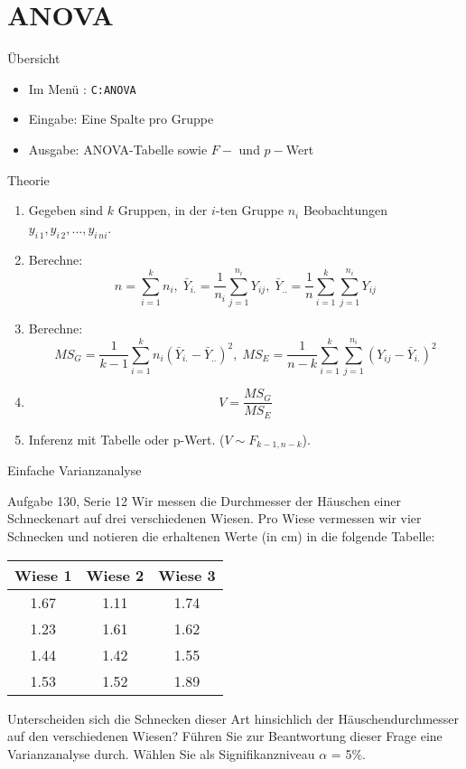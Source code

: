 \documentclass{beamer}
\newlength{\tikey}
\newcommand{\keystroke}[1]{\settowidth{\tikey}{\scriptsize #1}\psframebox[framearc=0.2]{\parbox{\tikey}{\scriptsize #1}}}
\begin{document}
\section{ANOVA}
\begin{frame}{Übersicht}
\begin{itemize}
\item Im Menü \keystroke{F6}: \texttt{C:ANOVA}
\item Eingabe: Eine Spalte pro Gruppe
\item Ausgabe: ANOVA-Tabelle sowie $F-$ und $p-$Wert
\end{itemize}
\end{frame}

\begin{frame}{Theorie}
\begin{enumerate}
\item Gegeben sind $k$ Gruppen, in der $i$-ten Gruppe $n_i$ Beobachtungen
$y_{i\,1}, y_{i\,2}, \ldots, y_{i\,ni}$.
\item Berechne:
$$
n=\sum_{i=1}^k n_i,\;
\bar{Y}_{i.}=\frac{1}{n_i}\sum_{j=1}^{n_i}Y_{ij},\; 
\bar{Y}_{..}=\frac{1}{n}\sum_{i=1}^k\sum_{j=1}^{n_i}Y_{ij}
$$
\item Berechne:
$$
MS_G=\frac{1}{k-1}\sum_{i=1}^k n_i(\bar{Y}_{i.}-\bar{Y}_{..})^2,\;
MS_E=\frac{1}{n-k}\sum_{i=1}^k\sum_{j=1}^{n_i}(Y_{ij}-\bar{Y}_{i.})^2
$$
\item
$$
V=\frac{MS_G}{MS_E}
$$
\item Inferenz mit Tabelle oder p-Wert. ($V\sim F_{k-1,n-k}$).
\end{enumerate}
\end{frame}


\begin{frame}{Einfache Varianzanalyse}
\begin{beamerboxesrounded}[shadow]{Aufgabe 130, Serie 12}
Wir messen die Durchmesser der Häuschen einer Schneckenart auf drei verschiedenen
Wiesen. Pro Wiese vermessen wir vier Schnecken und notieren die erhaltenen Werte (in
cm) in die folgende Tabelle:

\vspace{2mm}\begin{center}{\scriptsize\begin{tabular}{ccc}\toprule
Wiese 1 & Wiese 2 & Wiese 3\\\midrule
 1.67 &  1.11 &  1.74\\
 1.23 &  1.61 &  1.62\\
 1.44 &  1.42 &  1.55\\
 1.53 &  1.52 &  1.89\\\bottomrule
\end{tabular}}\end{center} \vspace{2mm}

Unterscheiden sich die Schnecken dieser Art hinsichlich der Häuschendurchmesser auf den
verschiedenen Wiesen? Führen Sie zur Beantwortung dieser Frage eine Varianzanalyse
durch. Wählen Sie als Signifikanzniveau $\alpha$ = 5\%.
\end{beamerboxesrounded}
\end{frame}
\end{document}

